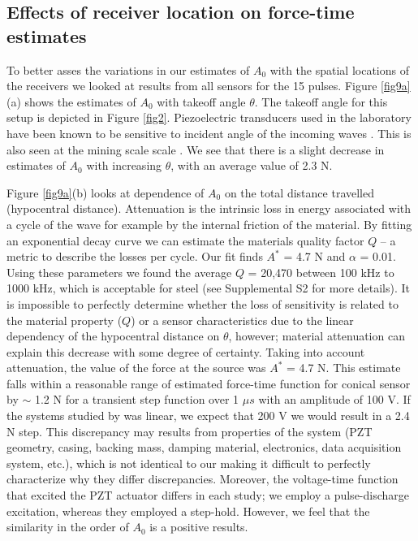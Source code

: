 \documentclass[preprint,3p, 11pt,authoryear]{elsarticle}
\begin{document}
\subsection{Effects of receiver location on force-time estimates}

To better asses the variations in our estimates of $A_{0}$ with the spatial locations of the receivers we looked at results from all sensors for the 15 pulses. Figure \ref{fig9a}(a) shows the estimates of $A_{0}$ with takeoff angle $\theta$. The takeoff angle for this setup is depicted in Figure \ref{fig2}.  Piezoelectric transducers used in the laboratory have been known to be sensitive to incident angle of the incoming waves \citep{Goodfellow2015}.  This is also seen at the mining scale scale \citep{Kwaitek2011}. We see that there is a slight decrease in estimates of $A_{0}$ with increasing  $\theta$, with an average value of 2.3 N.  

Figure \ref{fig9a}(b) looks at dependence of $A_{0}$ on the total distance travelled (hypocentral distance).  Attenuation is the intrinsic loss in energy associated with a cycle of the wave for example by the internal friction of the material.  By fitting an exponential decay curve we can estimate the materials quality factor $Q$ -- a metric to describe the losses per cycle.  Our fit finds $A^{*}$ = 4.7 N and $\alpha$ = 0.01. Using these parameters we found the average $Q$ = 20,470 between 100 kHz to 1000 kHz, which is acceptable for steel (see Supplemental S2 for more details). It is impossible to perfectly determine whether the loss of sensitivity is related to the material property ($Q$) or a sensor characteristics due to the linear dependency of the hypocentral distance on $\theta$, however; material attenuation can explain this decrease with some degree of certainty. Taking into account attenuation, the value of the force at the source was $A^{*}$ = 4.7 N. This estimate falls within a reasonable range of estimated force-time function for conical sensor by \citet{Breckenridge1990} $\sim $ 1.2 N for a transient step function over 1 $\mu s$ with an amplitude of 100 V. If the systems studied by \citet{Breckenridge1990} was linear, we expect that 200 V we would result in a 2.4 N step.  This discrepancy may results from properties of the system (PZT geometry, casing, backing mass, damping material, electronics, data acquisition system, etc.), which is not identical to our making it difficult to perfectly characterize why they differ discrepancies. Moreover, the voltage-time function that excited the PZT actuator differs in each study; we employ a pulse-discharge excitation, whereas they employed a step-hold. However, we feel that the similarity in the order of $A_{0}$ is a positive results. 
\end{document}
